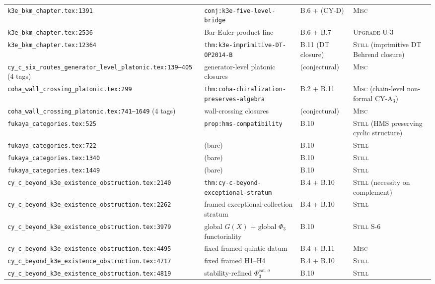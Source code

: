 \documentclass[11pt]{amsart}
\begin{document}
{{\begin{longtable}{@{}p{5.5cm}p{3cm}p{2cm}p{3.5cm}@{}}
\texttt{k3e\_bkm\_chapter.tex:1391} & \texttt{conj:k3e-five-level-bridge} & B.6 + (CY-D) & \textsc{Misc} \\
\texttt{k3e\_bkm\_chapter.tex:2536} & Bar-Euler-product line & B.6 + B.7 & \textsc{Upgrade} U-3 \\
\texttt{k3e\_bkm\_chapter.tex:12364} & \texttt{thm:k3e-imprimitive-DT-OP2014-B} & B.11 (DT closure) & \textsc{Still} (imprimitive DT Behrend closure) \\
\texttt{cy\_c\_six\_routes\_generator\_level\_platonic.tex:139--405} (4 tags) & generator-level platonic closures & (conjectural) & \textsc{Misc} \\
\texttt{coha\_wall\_crossing\_platonic.tex:299} & \texttt{thm:coha-chiralization-preserves-algebra} & B.2 + B.11 & \textsc{Misc} (chain-level non-formal CY-A$_3$) \\
\texttt{coha\_wall\_crossing\_platonic.tex:741--1649} (4 tags) & wall-crossing closures & (conjectural) & \textsc{Misc} \\
\texttt{fukaya\_categories.tex:525} & \texttt{prop:hms-compatibility} & B.10 & \textsc{Still} (HMS preserving cyclic structure) \\
\texttt{fukaya\_categories.tex:722} & (bare) & B.10 & \textsc{Still} \\
\texttt{fukaya\_categories.tex:1340} & (bare) & B.10 & \textsc{Still} \\
\texttt{fukaya\_categories.tex:1449} & (bare) & B.10 & \textsc{Still} \\
\texttt{cy\_c\_beyond\_k3e\_existence\_obstruction.tex:2140} & \texttt{thm:cy-c-beyond-exceptional-stratum} & B.4 + B.10 & \textsc{Still} (necessity on complement) \\
\texttt{cy\_c\_beyond\_k3e\_existence\_obstruction.tex:2262} & framed exceptional-collection stratum & B.4 + B.10 & \textsc{Still} \\
\texttt{cy\_c\_beyond\_k3e\_existence\_obstruction.tex:3979} & global $G(X)$ + global $\Phi_3$ functoriality & B.10 & \textsc{Still} S-6 \\
\texttt{cy\_c\_beyond\_k3e\_existence\_obstruction.tex:4495} & fixed framed quintic datum & B.4 + B.11 & \textsc{Misc} \\
\texttt{cy\_c\_beyond\_k3e\_existence\_obstruction.tex:4717} & fixed framed H1--H4 & B.4 + B.10 & \textsc{Still} \\
\texttt{cy\_c\_beyond\_k3e\_existence\_obstruction.tex:4819} & stability-refined $\Phi_3^{\mathrm{cat},\sigma}$ & B.10 & \textsc{Still} \\

\end{longtable}}}
\end{document}
